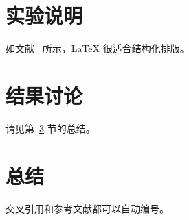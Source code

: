 \documentclass[12pt,a4paper]{ctexart} %
\begin{document}
\section{实验说明} %
如文献~\cite{lamport1994latex} 所示，LaTeX 很适合结构化排版。 %

\section{结果讨论} %
请见第~\ref{sec:conclusion} 节的总结。 %

\section{总结}
\label{sec:conclusion} %
交叉引用和参考文献都可以自动编号。 %

\printbibliography %
\end{document}
